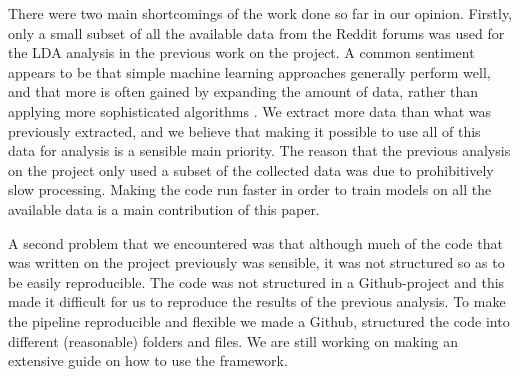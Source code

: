 \documentclass{article}
\begin{document}
There were two main shortcomings of the work done so far in our opinion. Firstly, only a small subset of all the available data from the Reddit forums was used for the LDA analysis in the previous work on the project. A common sentiment appears to be that simple machine learning approaches generally perform well, and that more is often gained by expanding the amount of data, rather than applying more sophisticated algorithms \cite{domingos2012few}. We extract more data than what was previously extracted, and we believe that making it possible to use all of this data for analysis is a sensible main priority. The reason that the previous analysis on the project only used a subset of the collected data was due to prohibitively slow processing. Making the code run faster in order to train models on all the available data is a main contribution of this paper. 

A second problem that we encountered was that although much of the code that was written on the project previously was sensible, it was not structured so as to be easily reproducible. The code was not structured in a Github-project and this made it difficult for us to reproduce the results of the previous analysis. To make the pipeline reproducible and flexible we made a Github, structured the code into different (reasonable) folders and files. We are still working on making an extensive guide on how to use the framework.
\end{document}
